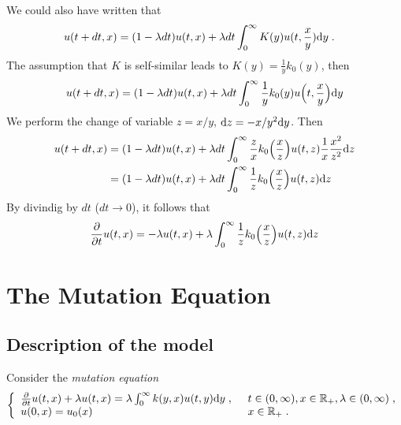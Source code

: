 \documentclass[11pt]{amsart}
\begin{document}
We could also have written that 
    \begin{align*}
        u(t + dt,x) 
        &= (1  - \lambda dt) u(t,x) + \lambda dt \int_0^\infty K(y) u (t, \frac{x}{y}) \mathrm dy
        \; .
    \end{align*}
The assumption that $K$ is self-similar leads to $K(y) = \frac{1}{y}k_0(y)$, then 
    \begin{equation*}
          u(t + dt,x)  = (1  - \lambda dt) u(t,x) + \lambda dt \int_0^\infty \frac{1}{y}k_0(y) u \Big( t, \frac{x}{y}\Big) \mathrm dy
    \end{equation*}
We perform the change of variable $z = x/y$, $\mathrm dz = -x/y^2 \mathrm dy$. Then 
    \begin{align*}
        u(t + dt,x)  
        &= (1  - \lambda dt) u(t,x) + \lambda dt \int_0^\infty \frac{z}{x}k_0\Big(\frac{x}{z}\Big) u ( t, z) \frac{1}{x} \frac{x^2}{z^2 }\mathrm dz\\
        &= (1  - \lambda dt) u(t,x) + \lambda dt \int_0^\infty \frac{1}{z}k_0\Big(\frac{x}{z}\Big) u ( t, z) \mathrm dz        
    \end{align*}
By divindig  by $dt$ ($dt \to 0$), it follows that 
    \begin{equation*}
        \frac{\partial}{\partial t} u(t,x) 
        = 
        -\lambda u(t,x)
        + 
        \lambda \int_0^\infty \frac{1}{z}k_0\Big(\frac{x}{z}\Big) u ( t, z) \mathrm dz     
    \end{equation*}



\section{The Mutation Equation}

\subsection{Description of the model}

Consider the \textit{mutation equation}
\begin{equation}\left\{
    \begin{array}{ll}
	\frac{\partial}{\partial t}u(t,x) + \lambda u(t,x) = \lambda \int_{0}^{\infty} k(y, x) u(t,y) \mathrm dy
	\; , \enspace
	& t \in (0, \infty), x \in \mathbb{R}_+, \lambda \in (0, \infty) \; ,
	\\
	u(0, x) = u_0(x)
	& x \in \mathbb{R}_+
	\; .
    \end{array}
	\right.
	\label{eq:pseudo}
\end{equation}
\end{document}
